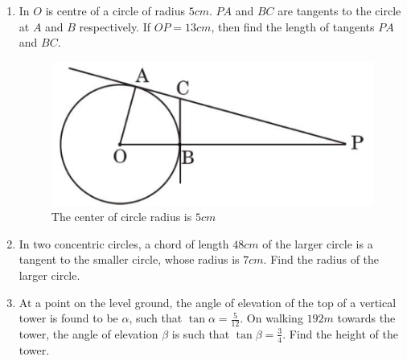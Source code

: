 \begin{enumerate}[label=\thesection.\arabic*.,ref=\theenumi]
    \item In $O$ is centre of a circle of radius $5 cm$. $PA$ and $BC$ are tangents to the circle at $A$ and $B$ respectively. If $OP = 13 cm$, then find the length of tangents $PA$ and $BC$.
\begin{figure}[H]                                                                                             
\centering                                                                                                
\includegraphics[width = \columnwidth]{figs/circle_radius23.png}
\caption{The center of circle radius is $5cm$}
\label{fig:circle_radius23}        
\end{figure}

    \item In two concentric circles, a chord of length $48 cm$ of the larger
circle is a tangent to the smaller circle, whose radius is $7 cm$. Find the radius of the larger circle. 
    \item At a point on the level ground, the angle of elevation of the top
of a vertical tower is found to be $\alpha$, such that $\tan \alpha =\frac{5}{12} $. On walking $192 m$ towards the tower, the angle of elevation $\beta$ is such that $\tan \beta=\frac{3}{4}$. Find the height of the tower. 
\end{enumerate}
